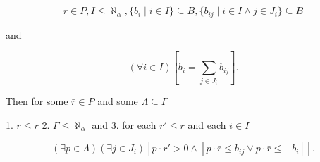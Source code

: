$$r \in P, \bar{I} \leq \aleph_\alpha, \{b_i \mid i \in I\} \subseteq B, \{b_{ij} \mid i \in I \land j \in J_i\} \subseteq B$$

and

$$(\forall i \in I) \left[ b_i = \sum_{j \in J_i} b_{ij} \right].$$

Then for some $\bar{r} \in P$ and some $\Lambda \subseteq \Gamma$

1. $\bar{r} \leq r$
2. $\Gamma \leq \aleph_\alpha$ and
3. for each $r' \leq \bar{r}$ and each $i \in I$

$$(\exists p \in \Lambda)(\exists j \in J_i) [p \cdot r' > 0 \land [p \cdot \bar{r} \leq b_{ij} \lor p \cdot \bar{r} \leq -b_i]].$$
